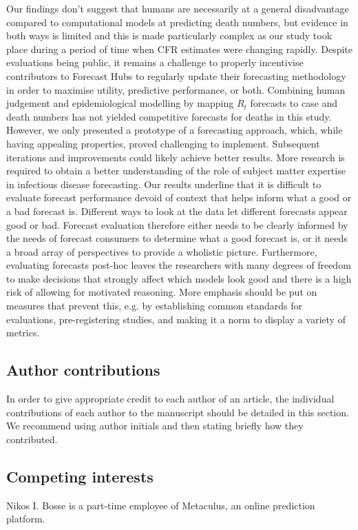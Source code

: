 \documentclass[10pt,a4paper,twocolumn]{article}
\begin{document}
Our findings don't suggest that humans are necessarily at a general disadvantage compared to computational models at predicting death numbers, but evidence in both ways is limited and this is made particularly complex as our study took place during a period of time when CFR estimates were changing rapidly. Despite evaluations being public, it remains a challenge to properly incentivise contributors to Forecast Hubs to regularly update their forecasting methodology in order to maximise utility, predictive performance, or both. Combining human judgement and epidemiological modelling by mapping $R_t$ forecasts to case and death numbers has not yielded competitive forecasts for deaths in this study. However, we only presented a prototype of a forecasting approach, which, while having appealing properties, proved challenging to implement. Subsequent iterations and improvements could likely achieve better results. More research is required to obtain a better understanding of the role of subject matter expertise in infectious disease forecasting. Our results underline that it is difficult to evaluate forecast performance devoid of context that helps inform what a good or a bad forecast is. Different ways to look at the data let different forecasts appear good or bad. Forecast evaluation therefore either needs to be clearly informed by the needs of forecast consumers to determine what a good forecast is, or it needs a broad array of perspectives to provide a wholistic picture. Furthermore, evaluating forecasts post-hoc leaves the researchers with many degrees of freedom to make decisions that strongly affect which models look good and there is a high risk of allowing for motivated reasoning. More emphasis should be put on measures that prevent this, e.g. by establishing common standards for evaluations, pre-registering studies, and making it a norm to display a variety of metrics. 








\subsection*{Author contributions}
In order to give appropriate credit to each author of an article, the individual
contributions of each author to the manuscript should be detailed in this section. We
recommend using author initials and then stating briefly how they contributed.

\subsection*{Competing interests}
Nikos I. Bosse is a part-time employee of Metaculus, an online prediction platform. 
\end{document}
